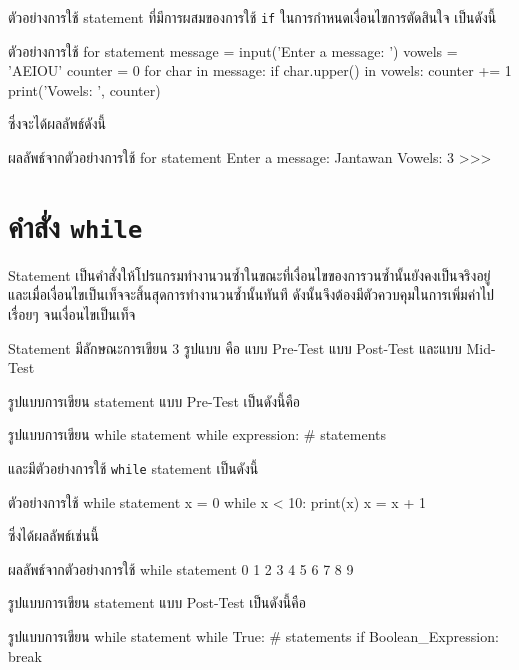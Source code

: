 ตัวอย่างการใช้   statement ที่มีการผสมของการใช้ \texttt{if} ในการกำหนดเงื่อนไขการตัดสินใจ เป็นดังนี้
\begin{codelist}{ตัวอย่างการใช้ for statement}{}
message = input('Enter a message: ')
vowels = 'AEIOU'
counter = 0
for char in message:
    if char.upper() in vowels:
        counter += 1
print('Vowels: ', counter)
\end{codelist}


ซึ่งจะได้ผลลัพธ์ดังนี้

\begin{codelist}{ผลลัพธ์จากตัวอย่างการใช้ for statement}{}
Enter a message: Jantawan
Vowels:  3
>>> 
\end{codelist}




\section{คำสั่ง \texttt{while}}

  Statement เป็นคำสั่งให้โปรแกรมทำงานวนซ้ำในขณะที่เงื่อนไขของการวนซ้ำนั้นยังคงเป็นจริงอยู่ และเมื่อเงื่อนไขเป็นเท็จจะสิ้นสุดการทำงานวนซ้ำนั้นทันที ดังนั้นจึงต้องมีตัวควบคุมในการเพิ่มค่าไปเรื่อยๆ จนเงื่อนไขเป็นเท็จ 
 
  Statement มีลักษณะการเขียน 3 รูปแบบ คือ แบบ Pre-Test แบบ Post-Test และแบบ Mid-Test
 
รูปแบบการเขียน   statement แบบ Pre-Test เป็นดังนี้คือ

\begin{codelist}{รูปแบบการเขียน while statement}{}
while expression:
    # statements
\end{codelist}

และมีตัวอย่างการใช้ \texttt{while} statement เป็นดังนี้

\begin{codelist}{ตัวอย่างการใช้ while statement}{}
x = 0
while x < 10:
    print(x)
    x = x + 1
\end{codelist}

ซึ่งได้ผลลัพธ์เช่นนี้

\begin{codelist}{ผลลัพธ์จากตัวอย่างการใช้ while statement}{}
0
1
2
3
4
5
6
7
8
9
\end{codelist}

รูปแบบการเขียน   statement แบบ Post-Test เป็นดังนี้คือ

\begin{codelist}{รูปแบบการเขียน while statement}{}
while True:
    # statements
    if Boolean_Expression: break
\end{codelist}


